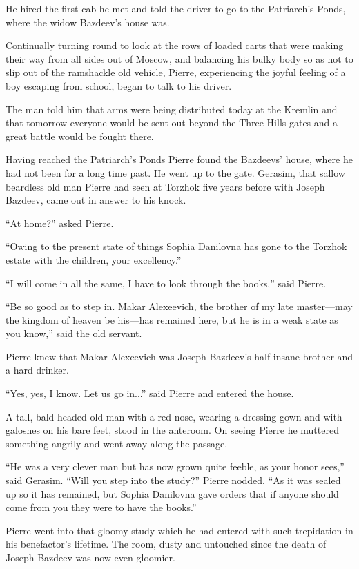 He hired the first cab he met and told the driver to go to the
Patriarch's Ponds, where the widow Bazdeev's house was.

Continually turning round to look at the rows of loaded carts
that were making their way from all sides out of Moscow, and
balancing his bulky body so as not to slip out of the ramshackle
old vehicle, Pierre, experiencing the joyful feeling of a boy
escaping from school, began to talk to his driver.

The man told him that arms were being distributed today at the
Kremlin and that tomorrow everyone would be sent out beyond the
Three Hills gates and a great battle would be fought there.

Having reached the Patriarch's Ponds Pierre found the Bazdeevs'
house, where he had not been for a long time past. He went up to
the gate.  Gerasim, that sallow beardless old man Pierre had seen
at Torzhok five years before with Joseph Bazdeev, came out in
answer to his knock.

``At home?'' asked Pierre.

``Owing to the present state of things Sophia Danilovna has gone
to the Torzhok estate with the children, your excellency.''

``I will come in all the same, I have to look through the
books,'' said Pierre.

``Be so good as to step in. Makar Alexeevich, the brother of my
late master---may the kingdom of heaven be his---has remained
here, but he is in a weak state as you know,'' said the old
servant.

Pierre knew that Makar Alexeevich was Joseph Bazdeev's
half-insane brother and a hard drinker.

``Yes, yes, I know. Let us go in...'' said Pierre and entered the
house.

A tall, bald-headed old man with a red nose, wearing a dressing
gown and with galoshes on his bare feet, stood in the
anteroom. On seeing Pierre he muttered something angrily and went
away along the passage.

``He was a very clever man but has now grown quite feeble, as
your honor sees,'' said Gerasim. ``Will you step into the
study?'' Pierre nodded. ``As it was sealed up so it has remained,
but Sophia Danilovna gave orders that if anyone should come from
you they were to have the books.''

Pierre went into that gloomy study which he had entered with such
trepidation in his benefactor's lifetime. The room, dusty and
untouched since the death of Joseph Bazdeev was now even
gloomier.

